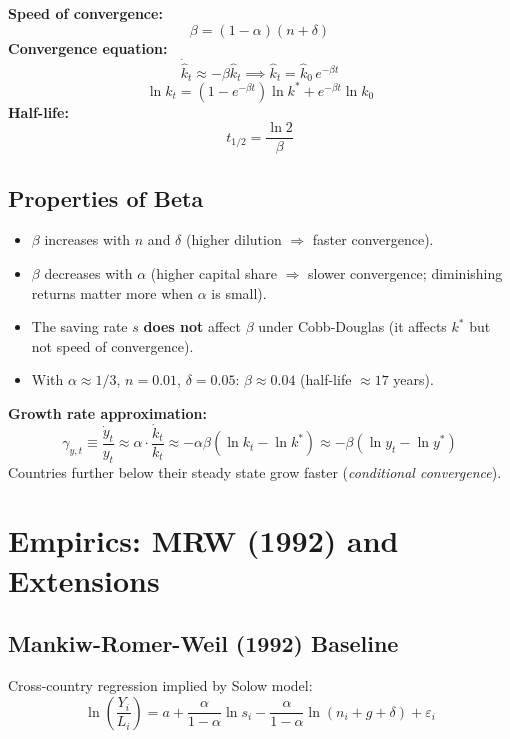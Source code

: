 \documentclass[a4paper,11pt]{article}
\begin{document}
\begin{resultbox}
\textbf{Speed of convergence:}
\[
\boxed{\beta = (1-\alpha)(n+\delta)}
\]
\textbf{Convergence equation:}
\[
\dot{\hat{k}}_t \approx -\beta \hat{k}_t \implies \hat{k}_t = \hat{k}_0\, e^{-\beta t}
\]
\[
\ln k_t = (1-e^{-\beta t})\ln k^* + e^{-\beta t} \ln k_0
\]
\textbf{Half-life:}
\[
t_{1/2} = \frac{\ln 2}{\beta}
\]
\end{resultbox}

\subsection*{Properties of Beta}

\begin{itemize}
    \item $\beta$ increases with $n$ and $\delta$ (higher dilution $\Rightarrow$ faster convergence).
    \item $\beta$ decreases with $\alpha$ (higher capital share $\Rightarrow$ slower convergence; diminishing returns matter more when $\alpha$ is small).
    \item The saving rate $s$ \textbf{does not} affect $\beta$ under Cobb-Douglas (it affects $k^*$ but not speed of convergence).
    \item With $\alpha \approx 1/3$, $n=0.01$, $\delta=0.05$: $\beta \approx 0.04$ (half-life $\approx 17$ years).
\end{itemize}

\begin{keyformulabox}
\textbf{Growth rate approximation:}
\[
\gamma_{y,t} \equiv \frac{\dot{y}_t}{y_t} \approx \alpha \cdot \frac{\dot{k}_t}{k_t} \approx -\alpha\beta(\ln k_t - \ln k^*)
\approx -\beta(\ln y_t - \ln y^*)
\]
Countries further below their steady state grow faster (\emph{conditional convergence}).
\end{keyformulabox}

\section{Empirics: MRW (1992) and Extensions}

\subsection*{Mankiw-Romer-Weil (1992) Baseline}

Cross-country regression implied by Solow model:
\[
\ln\!\left(\frac{Y_i}{L_i}\right) = a + \frac{\alpha}{1-\alpha}\ln s_i - \frac{\alpha}{1-\alpha}\ln(n_i + g + \delta) + \varepsilon_i
\]
\end{document}
